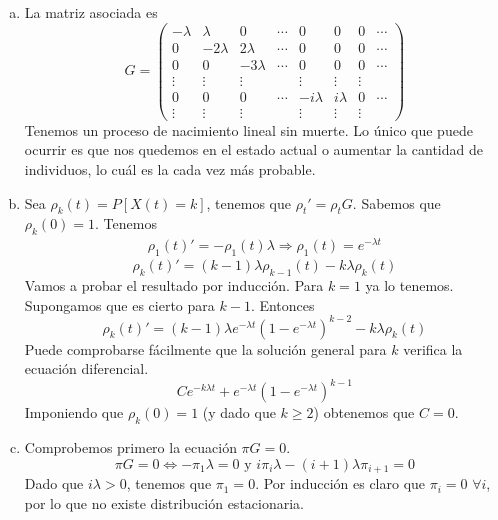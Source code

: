 \documentclass[twoside]{article}
\begin{document}
\begin{solucion}
\begin{enumerate}[a)]
\begin{center}
\end{center}
\item La matriz asociada es
$$
G= 
\begin{pmatrix}
-\lambda & \lambda & 0 &  \cdots & 0 & 0 & 0 & \cdots \\
0 & -2\lambda & 2\lambda &  \cdots& 0 & 0 & 0 &\cdots \\
0 & 0 & -3\lambda & \cdots & 0 & 0 & 0 &\cdots \\
\vdots & \vdots& \vdots & & \vdots & \vdots & \vdots\\
0 & 0 & 0 & \cdots & -i\lambda & i \lambda & 0 & \cdots\\
\vdots & \vdots & \vdots & & \vdots & \vdots & \vdots
\end{pmatrix}
$$
Tenemos un proceso de nacimiento lineal sin muerte. Lo único que puede ocurrir es que nos quedemos en el estado actual o aumentar la cantidad de individuos, lo cuál es la cada vez más probable.
\item Sea $\rho_k(t) = P[X(t)=k]$, tenemos que $\rho_t'=\rho_t G$. Sabemos que $\rho_k(0)=1$. Tenemos 
\begin{align*}
\rho_1(t)' = -\rho_1(t)\lambda \Rightarrow \rho_1(t)=e^{-\lambda t}
\end{align*}
$$
\rho_k(t)' = (k-1)\lambda\rho_{k-1}(t)-k\lambda\rho_k(t)
$$
Vamos a probar el resultado por inducción. Para $k=1$ ya lo tenemos. Supongamos que es cierto para $k-1$. Entonces
$$
\rho_k(t)' = (k-1)\lambda e^{-\lambda t}(1-e^{-\lambda t})^{k-2}-k\lambda\rho_k(t)
$$
Puede comprobarse fácilmente que la solución general para $k$ verifica la ecuación diferencial.
$$
Ce^{-k\lambda t} + e^{-\lambda t}(1-e^{-\lambda t})^{k-1}
$$
Imponiendo que $\rho_k(0)=1$ (y dado que $k\geq 2$) obtenemos que $C=0$. 
\item Comprobemos primero la ecuación $\pi G=0$.
$$
\pi G = 0 \Leftrightarrow -\pi_1 \lambda  = 0 \text{ y } i\pi_i \lambda - (i+1)\lambda \pi_{i+1} = 0
$$
Dado que $i\lambda > 0$, tenemos que $\pi_1 = 0$. Por inducción es claro que $\pi_i = 0$ $\forall i$, por lo que no existe distribución estacionaria.
\end{enumerate}
\end{solucion}
\end{document}
